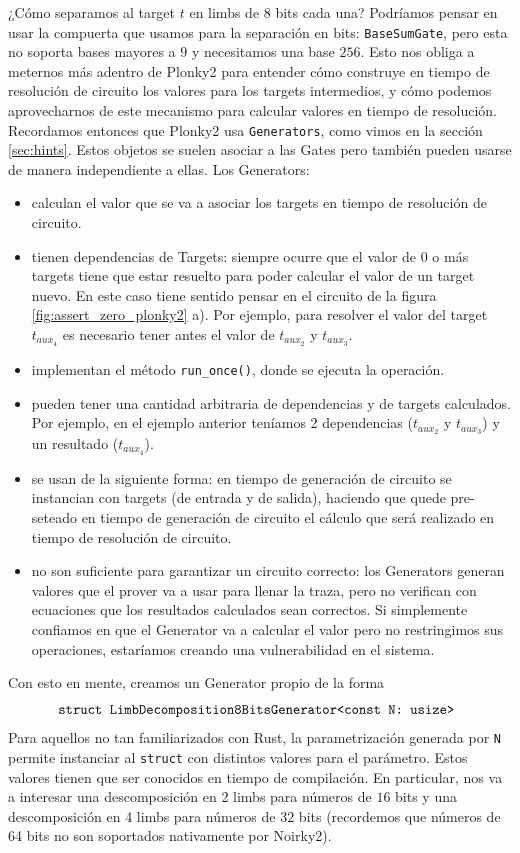 ¿Cómo separamos al target $t$ en limbs de 8 bits cada una? Podríamos pensar en usar la compuerta que usamos para la separación en bits: \texttt{BaseSumGate}, pero esta no soporta bases mayores a $9$ y necesitamos una base $256$. Esto nos obliga a meternos más adentro de Plonky2 para entender cómo construye en tiempo de resolución de circuito los valores para los targets intermedios, y cómo podemos aprovecharnos de este mecanismo para calcular valores en tiempo de resolución. Recordamos entonces que Plonky2 usa \texttt{Generators}, como vimos en la sección \ref{sec:hints}. Estos objetos se suelen asociar a las Gates pero también pueden usarse de manera independiente a ellas. Los Generators:
\begin{itemize}
    \item calculan el valor que se va a asociar los targets en tiempo de resolución de circuito. 
    \item tienen dependencias de Targets: siempre ocurre que el valor de $0$ o más targets tiene que estar resuelto para poder calcular el valor de un target nuevo. En este caso tiene sentido pensar en el circuito de la figura \ref{fig:assert_zero_plonky2} a). Por ejemplo, para resolver el valor del target $t_{aux_4}$ es necesario tener antes el valor de $t_{aux_2}$ y $t_{aux_3}$.
    \item implementan el método \texttt{run\_once()}, donde se ejecuta la operación. 
    \item pueden tener una cantidad arbitraria de dependencias y de targets calculados. Por ejemplo, en el ejemplo anterior teníamos 2 dependencias ($t_{aux_2}$ y $t_{aux_3}$) y un resultado ($t_{aux_4}$).
    \item se usan de la siguiente forma: en tiempo de generación de circuito se instancian con targets (de entrada y de salida), haciendo que quede pre-seteado en tiempo de generación de circuito el cálculo que será realizado en tiempo de resolución de circuito.
    \item no son suficiente para garantizar un circuito correcto: los Generators generan valores que el prover va a usar para llenar la traza, pero no verifican con ecuaciones que los resultados calculados sean correctos. Si simplemente confiamos en que el Generator va a calcular el valor pero no restringimos sus operaciones, estaríamos creando una vulnerabilidad en el sistema. 
\end{itemize}

Con esto en mente, creamos un Generator propio de la forma 
\[
\text{\texttt{struct LimbDecomposition8BitsGenerator<const N: usize> }}
\]
Para aquellos no tan familiarizados con Rust, la parametrización generada por \texttt{N} permite instanciar al \texttt{struct} con distintos valores para el parámetro. Estos valores tienen que ser conocidos en tiempo de compilación. En particular, nos va a interesar una descomposición en 2 limbs para números de $16$ bits y una descomposición en 4 limbs para números de $32$ bits (recordemos que números de 64 bits no son soportados nativamente por Noirky2). 

